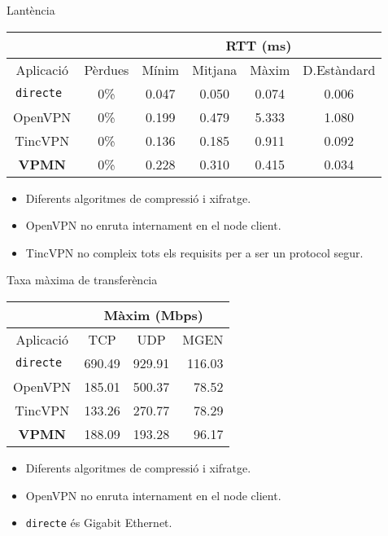     \begin{frame}{Lantència}
        \begin{center}
\begin{tabular}{|c|c|c|c|c|c|}
\multicolumn{2}{c}{} & \multicolumn{4}{|c|}{RTT (ms)} \\ \hline
Aplicació & Pèrdues & Mínim & Mitjana & Màxim & D.Estàndard \\ \hline \hline
\tt directe & 0\% & 0.047 & 0.050 & 0.074 & 0.006 \\ \hline
OpenVPN & 0\% & 0.199 & 0.479 & 5.333 & 1.080 \\ \hline
TincVPN & 0\% & 0.136 & 0.185 & 0.911 & 0.092 \\ \hline
\bf VPMN & 0\% & 0.228 & 0.310 & 0.415 & 0.034 \\ \hline
\end{tabular}
        \end{center}
        \begin{itemize}
\item Diferents algoritmes de compressió i xifratge.
\item OpenVPN no enruta internament en el node client.
\item TincVPN no compleix tots els requisits per a ser un protocol segur.
        \end{itemize}
    \end{frame}
    \begin{frame}{Taxa màxima de transferència}
        \begin{center}
\begin{tabular}{|c|c|c|r|}
\multicolumn{1}{c}{} & \multicolumn{3}{|c|}{Màxim (Mbps)} \\ \hline
Aplicació & TCP & UDP & MGEN \\ \hline \hline
\tt directe & 690.49 & 929.91 & 116.03 \\ \hline
OpenVPN & 185.01 & 500.37 & 78.52 \\ \hline
TincVPN & 133.26 & 270.77 & 78.29 \\ \hline
\bf VPMN & 188.09 & 193.28 & 96.17 \\ \hline
\end{tabular}
        \end{center}
        \begin{itemize}
\item Diferents algoritmes de compressió i xifratge.
\item OpenVPN no enruta internament en el node client.
\item {\tt directe} és Gigabit Ethernet.
        \end{itemize}
    \end{frame}
